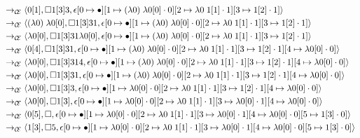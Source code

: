 \begin{figure}
\begin{align*}
&\rightarrow_{\mathcal{\mathcal{C} \mskip -4mu \mathcal{E}}}\langle 0[1],\square 1[3] 3,\epsilon[0\mapsto\bullet][1\mapsto(\lambda0)\;\lambda0[0]\cdot0][2\mapsto\lambda0\;1[1]\cdot1][3\mapsto1[2]\cdot1]\rangle\\ 
&\rightarrow_{\mathcal{\mathcal{C} \mskip -4mu \mathcal{E}}}\langle (\lambda0)\;\lambda0[0],\square 1[3] 3 1,\epsilon[0\mapsto\bullet][1\mapsto(\lambda0)\;\lambda0[0]\cdot0][2\mapsto\lambda0\;1[1]\cdot1][3\mapsto1[2]\cdot1]\rangle\\ 
&\rightarrow_{\mathcal{\mathcal{C} \mskip -4mu \mathcal{E}}}\langle \lambda0[0],\square 1[3] 3 1 \lambda0[0],\epsilon[0\mapsto\bullet][1\mapsto(\lambda0)\;\lambda0[0]\cdot0][2\mapsto\lambda0\;1[1]\cdot1][3\mapsto1[2]\cdot1]\rangle\\ 
&\rightarrow_{\mathcal{\mathcal{C} \mskip -4mu \mathcal{E}}}\langle 0[4],\square 1[3] 3 1,\epsilon[0\mapsto\bullet][1\mapsto(\lambda0)\;\lambda0[0]\cdot0][2\mapsto\lambda0\;1[1]\cdot1][3\mapsto1[2]\cdot1][4\mapsto\lambda0[0]\cdot0]\rangle\\ 
&\rightarrow_{\mathcal{\mathcal{C} \mskip -4mu \mathcal{E}}}\langle \lambda0[0],\square 1[3] 3 1 4,\epsilon[0\mapsto\bullet][1\mapsto(\lambda0)\;\lambda0[0]\cdot0][2\mapsto\lambda0\;1[1]\cdot1][3\mapsto1[2]\cdot1][4\mapsto\lambda0[0]\cdot0]\rangle\\ 
&\rightarrow_{\mathcal{\mathcal{C} \mskip -4mu \mathcal{E}}}\langle \lambda0[0],\square 1[3] 3 1,\epsilon[0\mapsto\bullet][1\mapsto(\lambda0)\;\lambda0[0]\cdot0][2\mapsto\lambda0\;1[1]\cdot1][3\mapsto1[2]\cdot1][4\mapsto\lambda0[0]\cdot0]\rangle\\ 
&\rightarrow_{\mathcal{\mathcal{C} \mskip -4mu \mathcal{E}}}\langle \lambda0[0],\square 1[3] 3,\epsilon[0\mapsto\bullet][1\mapsto\lambda0[0]\cdot0][2\mapsto\lambda0\;1[1]\cdot1][3\mapsto1[2]\cdot1][4\mapsto\lambda0[0]\cdot0]\rangle\\ 
&\rightarrow_{\mathcal{\mathcal{C} \mskip -4mu \mathcal{E}}}\langle \lambda0[0],\square 1[3],\epsilon[0\mapsto\bullet][1\mapsto\lambda0[0]\cdot0][2\mapsto\lambda0\;1[1]\cdot1][3\mapsto\lambda0[0]\cdot1][4\mapsto\lambda0[0]\cdot0]\rangle\\ 
&\rightarrow_{\mathcal{\mathcal{C} \mskip -4mu \mathcal{E}}}\langle 0[5],\square,\epsilon[0\mapsto\bullet][1\mapsto\lambda0[0]\cdot0][2\mapsto\lambda0\;1[1]\cdot1][3\mapsto\lambda0[0]\cdot1][4\mapsto\lambda0[0]\cdot0][5\mapsto1[3]\cdot0]\rangle\\ 
&\rightarrow_{\mathcal{\mathcal{C} \mskip -4mu \mathcal{E}}}\langle 1[3],\square 5,\epsilon[0\mapsto\bullet][1\mapsto\lambda0[0]\cdot0][2\mapsto\lambda0\;1[1]\cdot1][3\mapsto\lambda0[0]\cdot1][4\mapsto\lambda0[0]\cdot0][5\mapsto1[3]\cdot0]\rangle\\ 

\end{align*}
\end{figure}
